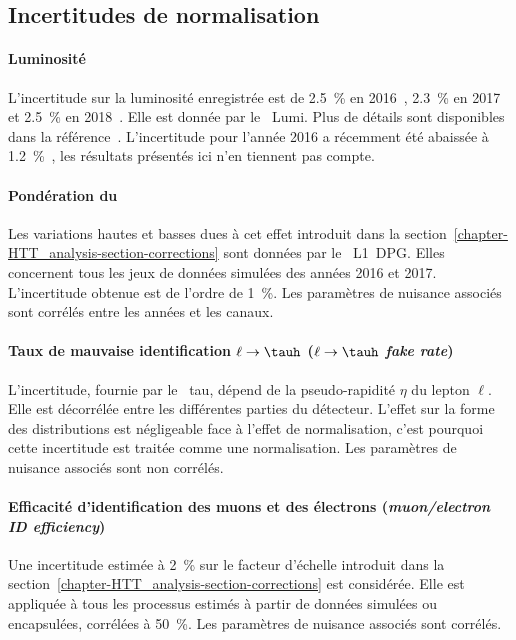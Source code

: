 \subsection{Incertitudes de normalisation}\label{chapter-HTT_analysis-section-systematics-normalization}
\paragraph{Luminosité}
L'incertitude sur la luminosité enregistrée est de
\SI{2.5}{\%} en 2016~\cite{CMS-PAS-LUM-17-001},
\SI{2.3}{\%} en 2017~\cite{CMS-PAS-LUM-17-004} et
\SI{2.5}{\%} en 2018~\cite{CMS-PAS-LUM-18-002}.
Elle est donnée par le \POG\ Lumi.
Plus de détails sont disponibles dans la référence~\cite{LumiTwiki}.
L'incertitude pour l'année 2016 a récemment été abaissée à \SI{1.2}{\%}~\cite{CMS-PAS-LUM-17-003},
les résultats présentés ici n'en tiennent pas compte.
\paragraph{Pondération du \prefiring}
Les variations hautes et basses dues à cet effet introduit dans la section~\ref{chapter-HTT_analysis-section-corrections} sont données par le \POG\ L1~DPG.
Elles concernent tous les jeux de données simulées des années 2016 et 2017.
L'incertitude obtenue est de l'ordre de \SI{1}{\%}.
Les paramètres de nuisance associés sont corrélés entre les années et les canaux.
\paragraph{Taux de mauvaise identification $\ell\to\tauh$ (\emph{$\ell\to\tauh$ fake rate})}
L'incertitude, fournie par le \POG\ tau, dépend de la pseudo-rapidité $\eta$ du lepton $\ell$.
Elle est décorrélée entre les différentes parties du détecteur.
L'effet sur la forme des distributions est négligeable face à l'effet de normalisation, c'est pourquoi cette incertitude est traitée comme une normalisation.
Les paramètres de nuisance associés sont non corrélés.
\paragraph{Efficacité d'identification des muons et des électrons (\emph{muon/electron ID efficiency})}
Une incertitude estimée à \SI{2}{\%} sur le facteur d'échelle introduit dans la section~\ref{chapter-HTT_analysis-section-corrections} est considérée.
Elle est appliquée à tous les processus estimés à partir de données simulées ou encapsulées, corrélées à \SI{50}{\%}.
Les paramètres de nuisance associés sont corrélés.
